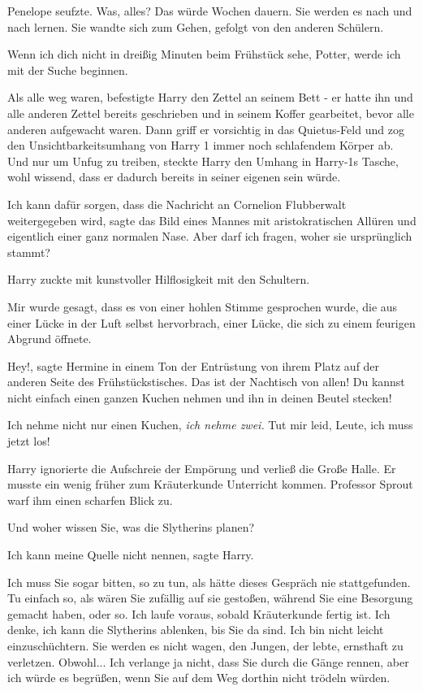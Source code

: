 Penelope seufzte. \glqq Was, alles? Das würde Wochen dauern. Sie werden es nach
und nach lernen.\grqq{} Sie wandte sich zum Gehen, gefolgt von den anderen
Schülern.

\glqq Wenn ich dich nicht in dreißig Minuten beim Frühstück sehe, Potter, werde
ich mit der Suche beginnen.\grqq{}

Als alle weg waren, befestigte Harry den Zettel an seinem Bett - er hatte ihn
und alle anderen Zettel bereits geschrieben und in seinem Koffer gearbeitet,
bevor alle anderen aufgewacht waren. Dann griff er vorsichtig in das
Quietus-Feld und zog den Unsichtbarkeitsumhang von Harry 1 immer noch
schlafendem Körper ab. Und nur um Unfug zu treiben, steckte Harry den Umhang in
Harry-1s Tasche, wohl wissend, dass er dadurch bereits in seiner eigenen sein
würde.

\glqq Ich kann dafür sorgen, dass die Nachricht an Cornelion Flubberwalt
weitergegeben wird\grqq{}, sagte das Bild eines Mannes mit aristokratischen
Allüren und eigentlich einer ganz normalen Nase. \glqq Aber darf ich fragen,
woher sie ursprünglich stammt?\grqq{}

Harry zuckte mit kunstvoller Hilflosigkeit mit den Schultern.

\glqq Mir wurde gesagt, dass es von einer hohlen Stimme gesprochen wurde, die
aus einer Lücke in der Luft selbst hervorbrach, einer Lücke, die sich zu einem
feurigen Abgrund öffnete.\grqq{}

\glqq Hey!\grqq{}, sagte Hermine in einem Ton der Entrüstung von ihrem Platz
auf der anderen Seite des Frühstückstisches. \glqq Das ist der Nachtisch von
allen! Du kannst nicht einfach einen ganzen Kuchen nehmen und ihn in deinen
Beutel stecken!\grqq{}

\glqq Ich nehme nicht nur einen Kuchen, \emph{ich nehme zwei.} Tut mir leid,
Leute, ich muss jetzt los!\grqq{}

Harry ignorierte die Aufschreie der Empörung und verließ die Große Halle. Er
musste ein wenig früher zum Kräuterkunde Unterricht kommen. Professor Sprout
warf ihm einen scharfen Blick zu.

\glqq Und woher wissen Sie, was die Slytherins planen?\grqq{}

\glqq Ich kann meine Quelle nicht nennen\grqq{}, sagte Harry.

\glqq Ich muss Sie sogar bitten, so zu tun, als hätte dieses Gespräch nie
stattgefunden. Tu einfach so, als wären Sie zufällig auf sie gestoßen, während
Sie eine Besorgung gemacht haben, oder so. Ich laufe voraus, sobald Kräuterkunde
fertig ist. Ich denke, ich kann die Slytherins ablenken, bis Sie da sind. Ich
bin nicht leicht einzuschüchtern. Sie werden es nicht wagen, den Jungen, der
lebte, ernsthaft zu verletzen. Obwohl... Ich verlange ja nicht, dass Sie durch
die Gänge rennen, aber ich würde es begrüßen, wenn Sie auf dem Weg dorthin nicht
trödeln würden.\grqq{}

